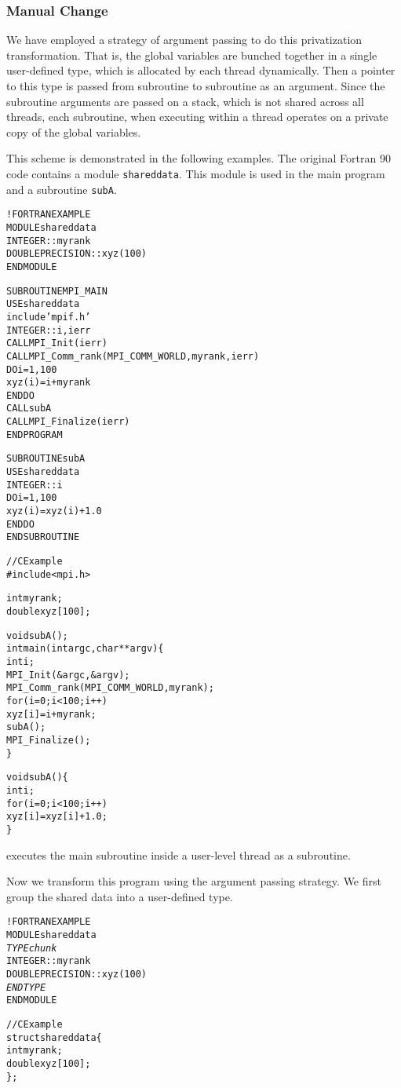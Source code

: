 \documentclass[10pt]{article}
\begin{document}
\subsubsection{Manual Change}
We have employed a strategy of argument passing to do this privatization
transformation. That is, the global variables are bunched together in a
single user-defined type, which is allocated by each thread dynamically. Then a
pointer to this type is passed from subroutine to subroutine as an argument.
Since the subroutine arguments are passed on a stack, which is not shared
across all threads, each subroutine, when executing within a thread operates on
a private copy of the global variables. 

This scheme is demonstrated in the following examples. The original Fortran 90 
code contains a module \texttt{shareddata}. This module is used in the main 
program and a subroutine \texttt{subA}.

\begin{alltt}
!FORTRAN EXAMPLE
MODULE shareddata
  INTEGER :: myrank
  DOUBLE PRECISION :: xyz(100)
END MODULE

SUBROUTINE MPI_MAIN
  USE shareddata
  include 'mpif.h'
  INTEGER :: i, ierr
  CALL MPI_Init(ierr)
  CALL MPI_Comm_rank(MPI_COMM_WORLD, myrank, ierr)
  DO i = 1, 100
    xyz(i) =  i + myrank
  END DO
  CALL subA
  CALL MPI_Finalize(ierr)
END PROGRAM

SUBROUTINE subA
  USE shareddata
  INTEGER :: i
  DO i = 1, 100
    xyz(i) = xyz(i) + 1.0
  END DO
END SUBROUTINE

//C Example
#include <mpi.h>

int myrank;
double xyz[100];

void subA();
int main(int argc, char** argv)\{
  int i;
  MPI_Init(&argc, &argv);
  MPI_Comm_rank(MPI_COMM_WORLD, myrank);
  for(i=0;i<100;i++)
    xyz[i] = i + myrank;
  subA();
  MPI_Finalize();
\}

void subA()\{
  int i;
  for(i=0;i<100;i++)
    xyz[i] = xyz[i] + 1.0;
\}
\end{alltt}

\ampi{} executes the main subroutine inside a user-level thread as a subroutine. 
 
Now we transform this program using the argument passing strategy. We first group the
shared data into a user-defined type.

\begin{alltt}
!FORTRAN EXAMPLE
MODULE shareddata
  \emph{TYPE chunk}
    INTEGER :: myrank
    DOUBLE PRECISION :: xyz(100)
  \emph{END TYPE}
END MODULE

//C Example
struct shareddata\{
  int myrank;
  double xyz[100];
\};
\end{alltt}
\end{document}
